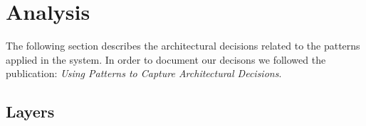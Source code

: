 \chapter{Analysis}
\label{ch:analysis}
The following section describes the architectural decisions related to the patterns applied in the system.
In order to document our decisons we followed the publication: \textit{Using Patterns to Capture Architectural Decisions}.

\newcommand{\EAA}{Patterns of Enterprise Application Architecture}

\section{Layers}

